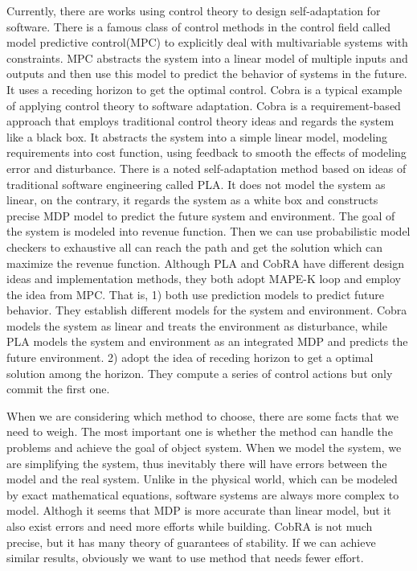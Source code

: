 \documentclass[sigconf]{acmart}
\begin{document}
Currently, there are works using control theory to design self-adaptation for software. There is a famous class of control methods in the control field called model predictive control(MPC) to explicitly deal with multivariable systems with constraints. MPC abstracts the system into a linear model of multiple inputs and outputs and then use this model to predict the behavior of systems in the future. It uses a receding horizon to get the optimal control.
Cobra is a typical example of applying control theory to software adaptation. Cobra is a requirement-based approach that employs traditional control theory ideas and regards the system like a black box. It abstracts the system into a simple linear model, modeling requirements into cost function, using feedback to smooth the effects of modeling error and disturbance.
There is a noted self-adaptation method based on ideas of traditional software engineering called PLA. It does not model the system as linear, on the contrary, it regards the system as a white box and constructs precise MDP model to predict the future system and environment. The goal of the system is modeled into revenue function. Then we can use probabilistic model checkers\cite{pmc} to exhaustive all can reach the path and get the solution which can maximize the revenue function.
Although PLA and CobRA have different design ideas and implementation methods, they both adopt MAPE-K loop\cite{mape-k} and employ the idea from MPC. That is, 
1) both use prediction models to predict future behavior. They establish different models for the system and environment.
Cobra models the system as linear and treats the environment as disturbance, while PLA models the system and environment as an integrated MDP and predicts the future environment.
2) adopt the idea of receding horizon to get a optimal solution among the horizon. They compute a series of control actions but only commit the first one.

When we are considering which method to choose, there are some facts that we need to weigh. The most important one is whether the method can handle the problems and achieve the goal of object system. When we model the system, we are simplifying the system, thus inevitably there will have errors between the model and the real system. Unlike in the physical world, which can be modeled by exact mathematical equations, software systems are always more complex to model. Althogh it seems that MDP is more accurate than linear model, but it also exist errors and need more efforts while building. CobRA is not much precise, but it has many theory of guarantees of stability. If we can achieve similar results, obviously we want to use method that needs fewer effort.
\end{document}

